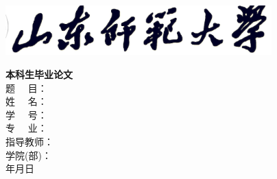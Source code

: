 \begin{titlepage}
	\vspace*{3mm}
	\begin{center}
		\includegraphics[width=0.77\textwidth,trim=8 0 0 0,clip]{data/resource/logo.jpg}
	\end{center}
	\vspace*{1cm}
	\fontsize{50pt}{24pt}
	\centering
	\textbf{本}\hfill\textbf{科}\hfill\textbf{生}\hfill\textbf{毕}\hfill\textbf{业}\hfill\textbf{论}\hfill\textbf{文}
	\\
	\vspace*{7.0cm}
	题~ \quad ~目：\underline{\makebox[\nlength]{\sdnutitlechs}}\\\vspace*{3mm}
	姓~ \quad ~名：\underline{\makebox[\nlength]{\sdnuauthorchs}}\\\vspace*{3mm}
	学~ \quad ~号：\underline{\makebox[\nlength]{\sdnuauthorid}}\\\vspace*{3mm}
	专~ \quad ~业：\underline{\makebox[\nlength]{\sdnumajorchs}}\\\vspace*{3mm}
	指导教师：\underline{\makebox[\nlength]{\sdnumentorchs}}\\\vspace*{3mm}
	学院(部)：\underline{\makebox[\nlength]{\sdnucollegechs}}\\\vspace*{2.2cm}
	\sdnuyear 年\sdnumon 月\sdnuday 日
\end{titlepage}
